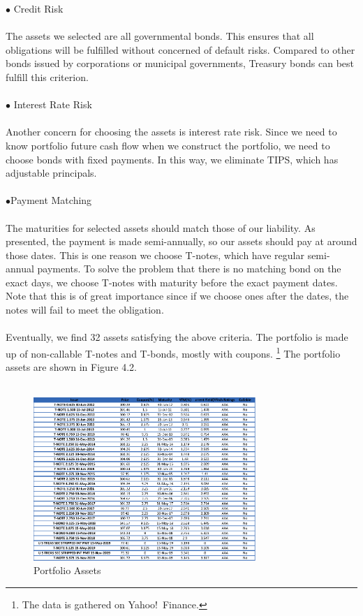 \documentclass[oneside,12pt]{report}
\begin{document}
\noindent $\bullet$ Credit Risk\\
\\
\noindent The assets we selected are all governmental bonds. This ensures that all obligations will be fulfilled without concerned of default risks. Compared to other bonds issued by corporations or municipal governments, Treasury bonds can best fulfill this criterion.\\
\\
$\bullet$ Interest Rate Risk\\
\\
Another concern for choosing the assets is interest rate risk. Since we need to know portfolio future cash flow when we construct the portfolio, we need to choose bonds with fixed payments. In this way, we eliminate TIPS, which has adjustable principals. \\
\\
$\bullet$Payment Matching\\
\\
The maturities for selected assets should match those of our liability. As presented, the payment is made semi-annually, so our assets should pay at around those dates. This is one reason we choose T-notes, which have regular semi-annual payments. To solve the problem that there is no matching bond on the exact days, we choose T-notes with maturity before the exact payment dates. Note that this is of great importance since if we choose ones after the dates, the notes will fail to meet the obligation.\\
\\
Eventually, we find 32 assets satisfying the above criteria. The portfolio is made up of non-callable T-notes and T-bonds, mostly with coupons. \footnote{The data is gathered on Yahoo!~Finance.} The portfolio assets are shown in Figure 4.2.\\
\\
\begin{figure}[htb]
    \begin{center}
        \includegraphics[width=0.75\textwidth]{finance.png}
    \end{center}
    \caption{Portfolio Assets}
\end{figure}
\end{document}
